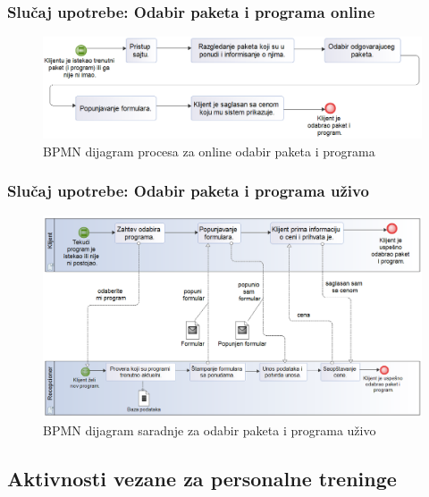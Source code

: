 \documentclass[a4paper]{article}
\begin{document}
\subsubsection{Slučaj upotrebe: Odabir paketa i programa online}

\begin{figure}[!ht]
\begin{center}
\includegraphics[scale=0.55]{sections/images/bpmn_dijagram_procesa_odabir_paketa_i_programa_online.png}
\end{center}
\caption{BPMN dijagram procesa za online odabir paketa i programa}
\label{fig:kontekst}
\end{figure}

\subsubsection{Slučaj upotrebe: Odabir paketa i programa uživo}

\begin{figure}[!ht]
\begin{center}
\includegraphics[scale=0.55]{sections/images/bpmn_dijagram_saradnje_odabir_paketa_i_programa_uzivo.png}
\end{center}
\caption{BPMN dijagram saradnje za odabir paketa i programa uživo}
\label{fig:kontekst}
\end{figure}


\newpage
\subsection{Aktivnosti vezane za personalne treninge}

\end{document}
